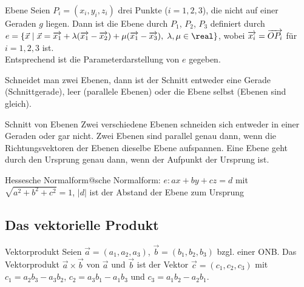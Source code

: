 \begin{Def}{Ebene}
    Seien $P_i = (x_i, y_i, z_i)$ drei Punkte ($i = 1, 2, 3$), die nicht auf
    einer Geraden $g$ liegen.
    Dann ist die Ebene durch $P_1$, $P_2$, $P_3$ definiert durch \\
    $e = \{\vec{x} \;|\; \vec{x} = \vektor{x_1} +
    \lambda (\vektor{x_1} - \vektor{x_2}) +
    \mu (\vektor{x_1} - \vektor{x_3}),\; \lambda, \mu \in \real\}$, wobei
    $\overrightarrow{x_i} = \overrightarrow{OP_i}$ für $i = 1, 2, 3$ ist. \\
    Entsprechend ist die Parameterdarstellung von $e$ gegeben.
\end{Def}

\begin{Bem}
    Schneidet man zwei Ebenen, dann ist der Schnitt entweder eine Gerade
    (Schnittgerade), leer (parallele Ebenen) oder die Ebene selbst (Ebenen
    sind gleich).
\end{Bem}

\begin{Satz}{Schnitt von Ebenen}
    Zwei verschiedene Ebenen schneiden sich entweder in einer Geraden oder gar
    nicht.
    Zwei Ebenen sind parallel genau dann, wenn die Richtungsvektoren
    der Ebenen dieselbe Ebene aufspannen.
    Eine Ebene geht durch den Ursprung genau dann, wenn der Aufpunkt der
    Ursprung ist.
\end{Satz}

\begin{Bem}
    {Hessesche Normalform@sche Normalform}: $e: ax + by + cz = d$
    mit $\sqrt{a^2 + b^2 + c^2} = 1$, $|d|$ ist der Abstand der Ebene zum
    Ursprung
\end{Bem}

\subsection{%
    Das vektorielle Produkt%
}

\begin{Def}{Vektorprodukt}
    Seien $\vec{a} = (a_1, a_2, a_3)$, $\vec{b} = (b_1, b_2, b_3)$ bzgl.
    einer ONB.
    Das Vektorprodukt $\vec{a} \times \vec{b}$ von $\vec{a}$ und $\vec{b}$ ist
    der Vektor $\vec{c} = (c_1, c_2, c_3)$ mit
    $c_1 = a_2 b_3 - a_3 b_2$, $c_2 = a_3 b_1 - a_1 b_3$ und
    $c_3 = a_1 b_2 - a_2 b_1$.
\end{Def}

